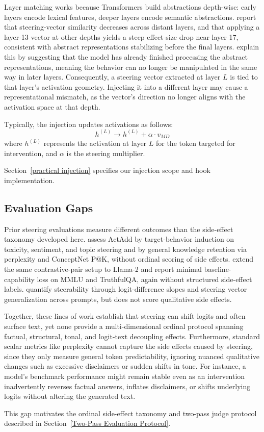 Layer matching works because Transformers build abstractions depth-wise: early layers encode lexical features, deeper layers encode semantic abstractions.
\cite{rimskySteeringLlama22024} report that steering-vector similarity decreases across distant layers, and that applying a layer-13 vector at other depths yields a steep effect-size drop near layer 17, consistent with abstract representations stabilizing before the final layers.
\cite{rimskySteeringLlama22024} explain this by suggesting that the model has already finished processing the abstract representations, meaning the behavior can no longer be manipulated in the same way in later layers.
Consequently, a steering vector extracted at layer $L$ is tied to that layer's activation geometry.
Injecting it into a different layer may cause a representational mismatch, as the vector's direction no longer aligns with the activation space at that depth.

Typically, the injection updates activations as follows:
$$h^{(L)} \rightarrow h^{(L)} + \alpha \cdot v_{MD}$$
where $h^{(L)}$ represents the activation at layer $L$ for the token targeted for intervention, and $\alpha$ is the steering multiplier.

Section~\ref{practical injection} specifies our injection scope and hook implementation.

\subsection{Evaluation Gaps}\label{sec:bg_evaluation_gaps}
Prior steering evaluations measure different outcomes than the side-effect taxonomy developed here.
\citet{turnerSteeringLanguageModels2023} assess ActAdd by target-behavior induction on toxicity, sentiment, and topic steering and by general knowledge retention via perplexity and ConceptNet P@K, without ordinal scoring of side effects.
\citet{rimskySteeringLlama22024} extend the same contrastive-pair setup to Llama-2 and report minimal baseline-capability loss on MMLU and TruthfulQA, again without structured side-effect labels.
\citet{tanAnalysingGeneralisationReliability2024} quantify steerability through logit-difference slopes and steering vector generalization across prompts, but does not score qualitative side effects.

Together, these lines of work establish that steering can shift logits and often surface text, yet none provide a multi-dimensional ordinal protocol spanning factual, structural, tonal, and logit-text decoupling effects.
Furthermore, standard scalar metrics like perplexity cannot capture the side effects caused by steering, since they only measure general token predictability, ignoring nuanced qualitative changes such as excessive disclaimers or sudden shifts in tone. For instance, a model's benchmark performance might remain stable even as an intervention inadvertently reverses factual answers, inflates disclaimers, or shifts underlying logits without altering the generated text.

This gap motivates the ordinal side-effect taxonomy and two-pass judge protocol described in Section~\ref{Two-Pass Evaluation Protocol}.

